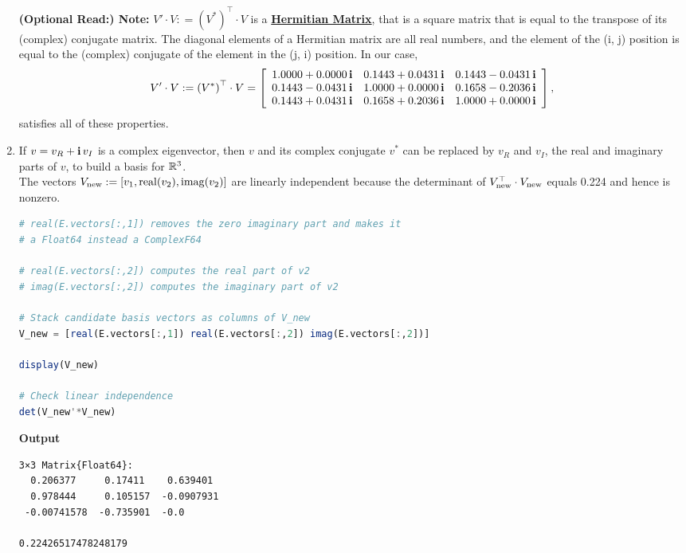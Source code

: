 \begin{enumerate}
\textbf{(Optional Read:) Note:} $V'\cdot V : = \left(V^\ast\right)^\top \cdot V$ is a \href{https://en.wikipedia.org/wiki/Hermitian_matrix}{\textbf{Hermitian Matrix}}, that is a square matrix that is equal to the transpose of its (complex) conjugate matrix. The diagonal elements of a Hermitian matrix are all real numbers, and the element of the (i, j) position is equal to the (complex) conjugate of the element in the (j, i) position. In our case,
$$ V'\cdot V : = \left(V^\ast\right)^\top \cdot V = \left[
\begin{array}{ccc}
1.0000+0.0000\mathop{\bm{\mathrm i}} & 0.1443+0.0431\mathop{\bm{\mathrm i}} & 0.1443-0.0431\mathop{\bm{\mathrm i}} \\
0.1443-0.0431\mathop{\bm{\mathrm i}} & 1.0000+0.0000\mathop{\bm{\mathrm i}} & 0.1658-0.2036\mathop{\bm{\mathrm i}} \\
0.1443+0.0431\mathop{\bm{\mathrm i}} & 0.1658+0.2036\mathop{\bm{\mathrm i}} & 1.0000+0.0000\mathop{\bm{\mathrm i}} \\
\end{array}
\right],$$
satisfies all of these properties.

\item If $v=v_R + \mathop{\bm{\mathrm i}} v_I$ is a complex eigenvector, then $v$  and its complex conjugate $v^\ast$ can be replaced by $v_R$ and $v_I$, the real and imaginary parts of $v$, to build a basis for $\mathbb R^3$.\\

The vectors $V_{\rm new}:=[v_1, {\rm real}(v_2), {\rm imag}(v_2) ]$ are linearly independent because the determinant of $V_{\rm new}^\top \cdot V_{\rm new}$ equals 0.224 and hence is nonzero.

\begin{lstlisting}[language=Julia,style=mystyle]
# real(E.vectors[:,1]) removes the zero imaginary part and makes it 
# a Float64 instead a ComplexF64

# real(E.vectors[:,2]) computes the real part of v2
# imag(E.vectors[:,2]) computes the imaginary part of v2

# Stack candidate basis vectors as columns of V_new
V_new = [real(E.vectors[:,1]) real(E.vectors[:,2]) imag(E.vectors[:,2])]

display(V_new)

# Check linear independence
det(V_new'*V_new)
\end{lstlisting}
\textbf{Output} 
\begin{verbatim}
3×3 Matrix{Float64}:
  0.206377     0.17411    0.639401
  0.978444     0.105157  -0.0907931
 -0.00741578  -0.735901  -0.0
 
0.22426517478248179
\end{verbatim}
 
\end{enumerate}
\Qed



